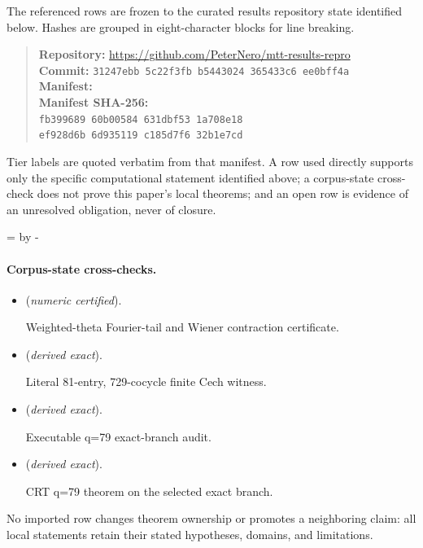 \documentclass[11pt]{article}
\theoremstyle{definition}
\theoremstyle{remark}
\newcommand{\1}{\mathbf 1}
\begin{document}
The referenced rows are frozen to the curated results repository state identified below. Hashes are grouped in eight-character blocks for line breaking.
\begin{quote}\small
\textbf{Repository:} \url{https://github.com/PeterNero/mtt-results-repro}\\
\textbf{Commit:} \texttt{31247ebb 5c22f3fb b5443024 365433c6 ee0bff4a}\\
\textbf{Manifest:} \\
\textbf{Manifest SHA-256:}\\
\texttt{fb399689 60b00584 631dbf53 1a708e18}\\
\texttt{ef928d6b 6d935119 c185d7f6 32b1e7cd}
\end{quote}

Tier labels are quoted verbatim from that manifest. A row used directly supports only the specific computational statement identified above; a corpus-state cross-check does not prove this paper's local theorems; and an open row is evidence of an unresolved obligation, never of closure.

\par\begingroup{}=\pagegoal\advance{} by -\pagetotal\ifdim\dimen0<7\baselineskip\newpage\fi\endgroup
\paragraph{Corpus-state cross-checks.}
\begin{itemize}
\setlength{\itemsep}{0.25em}
\item {} (\emph{numeric certified}).\par Weighted-theta Fourier-tail and Wiener contraction certificate.
\item {} (\emph{derived exact}).\par Literal 81-entry, 729-cocycle finite Cech witness.
\item {} (\emph{derived exact}).\par Executable q=79 exact-branch audit.
\item {} (\emph{derived exact}).\par CRT q=79 theorem on the selected exact branch.
\end{itemize}

No imported row changes theorem ownership or promotes a neighboring claim: all local statements retain their stated hypotheses, domains, and limitations.


\end{document}
